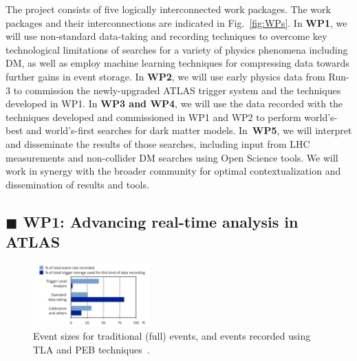 \documentclass[11pt,a4paper]{article}
\begin{document}
The project consists of five logically interconnected work packages.
The work packages and their interconnections are indicated in Fig.~\ref{fig:WPs}. 
In \textbf{WP1}, we will use non-standard data-taking and recording techniques to overcome key technological limitations of searches for a variety of physics phenomena including DM, as well as employ machine learning techniques for compressing data towards further gains in event storage.  
In \textbf{WP2}, we will use early physics data from Run-3 to commission the newly-upgraded ATLAS trigger system and the techniques developed in WP1.
In \textbf{WP3 and WP4}, we will use the data recorded with the techniques developed and commissioned in WP1 and WP2 to perform world's-best and world's-first searches for dark matter models. 
In~\textbf{WP5}, we will interpret and disseminate the results of those searches, including input from LHC measurements and non-collider DM searches using Open Science tools. We will work in synergy with the broader community for optimal contextualization and dissemination of results and tools. %

\subsection*{\color{teal} $\blacksquare$ \color{black} WP1: Advancing real-time analysis in ATLAS}

\begin{figure} \includegraphics[width=0.4\textwidth]{figs/TLAPEB}
\caption{\label{fig:TLAPEB} \small Event sizes for traditional (full) events, and events recorded using TLA and PEB techniques~\cite{ATLASTrigger}. \scriptsize }
\end{figure}
\end{document}
